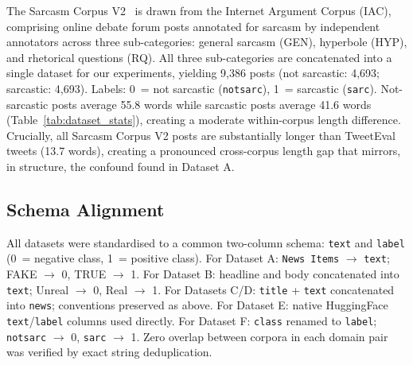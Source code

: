\documentclass[conference]{IEEEtran}
\begin{document}
The Sarcasm Corpus V2~\cite{oraby2016sarcasm} is drawn from the
Internet Argument Corpus (IAC), comprising online debate forum posts
annotated for sarcasm by independent annotators across three
sub-categories: general sarcasm (GEN), hyperbole (HYP), and rhetorical
questions (RQ). All three sub-categories are concatenated into a single
dataset for our experiments, yielding 9,386 posts (not sarcastic:
4,693; sarcastic: 4,693). Labels: 0~= not sarcastic
(\texttt{notsarc}), 1~= sarcastic (\texttt{sarc}). Not-sarcastic
posts average 55.8 words while sarcastic posts average 41.6 words
(Table~\ref{tab:dataset_stats}), creating a moderate within-corpus
length difference. Crucially, all Sarcasm Corpus V2 posts are
substantially longer than TweetEval tweets (13.7 words), creating a
pronounced cross-corpus length gap that mirrors, in structure, the
confound found in Dataset A.

\subsection{Schema Alignment}

All datasets were standardised to a common two-column schema:
\texttt{text} and \texttt{label} (0~= negative class, 1~= positive
class). For Dataset A: \texttt{News Items} $\to$ \texttt{text}; FAKE
$\to$ 0, TRUE $\to$ 1. For Dataset B: headline and body concatenated
into \texttt{text}; Unreal $\to$ 0, Real $\to$ 1. For Datasets C/D:
\texttt{title} + \texttt{text} concatenated into \texttt{news};
conventions preserved as above. For Dataset E: native HuggingFace
\texttt{text}/\texttt{label} columns used directly. For Dataset F:
\texttt{class} renamed to \texttt{label}; \texttt{notsarc} $\to$ 0,
\texttt{sarc} $\to$ 1. Zero overlap between corpora in each domain
pair was verified by exact string deduplication.
\end{document}

